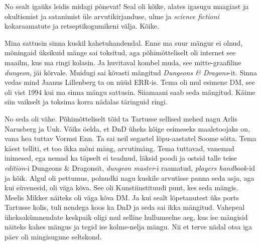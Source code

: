 No sealt igaüks leidis midagi põnevat! Seal oli kõike, alates igasugu maagiast ja okultismist ja satanimist üle arvutikirjanduse, ulme ja \emph{science fictioni} kokaraamatute ja retseptikogumikeni välja. Kõike.
                 
                 
Mina sattusin sinna kuskil kahetuhandendal. Enne ma suur mängur ei olnud, mõningaid üksikuid mänge  sai toksitud, aga põhimõtteliselt oli internet see maailm, kus ma ringi kolasin. Ja huvitaval kombel muda, see mitte-graafiline \emph{dungeon}, jäi kõrvale. Muidugi sai kõvasti mängitud \emph{Dungeons \& Dragons}-it. Sinna vedas mind Jaanus Lillenberg ta on nüüd ERR-is. Tema oli mul esimene DM, see oli vist 1994 kui ma sinna mängu sattusin. Siiamaani saab seda mängitud. Käime siin vaikselt ja toksima korra nädalas täringuid ringi.


No seda oli vähe. Põhimõtteliselt  tõid ta Tartusse sellised mehed nagu Arlis Narusberg ja Uuk. Võiks öelda, et DnD üheks kõige esimeseks maaletoojaks on, vana hea tuttav Vormsi Enn. Ta sai neil segastel lõpu-aastatel Soome sõita. Tema käest telliti, et too ikka mõni mäng, arvutimäng. Tema tuttavad, vanemad inimesed, ega nemad ka täpselt ei teadnud, läksid poodi ja ostsid talle teise \emph{edition}-i Dungeons \& Dragonsit, \emph{dungeon master}-i raamatud, \emph{players handbook}-id ja kõik. Algul oli pettumus, polnudki nagu kuskile arvutisse panna seda asja, aga kui süvenesid, oli väga kõva. See oli Kunstiinstituudi punt, kes seda mängis. Meelis Mikker näiteks oli väga kõva DM. Ja kui sealt lõpetanutest üks ports Tartusse kolis,  tuli nendega koos ka DnD ja seda sai ikka  mängitud. Vahepeal üheksakümnendate keskpaik oligi mul selline hullumeelne aeg, kus ise mängisid näiteks kahes mängus ja tegid ise kolme-nelja mängu. Nii et terve nädal otsa iga päev oli mingisugune seltskond.

